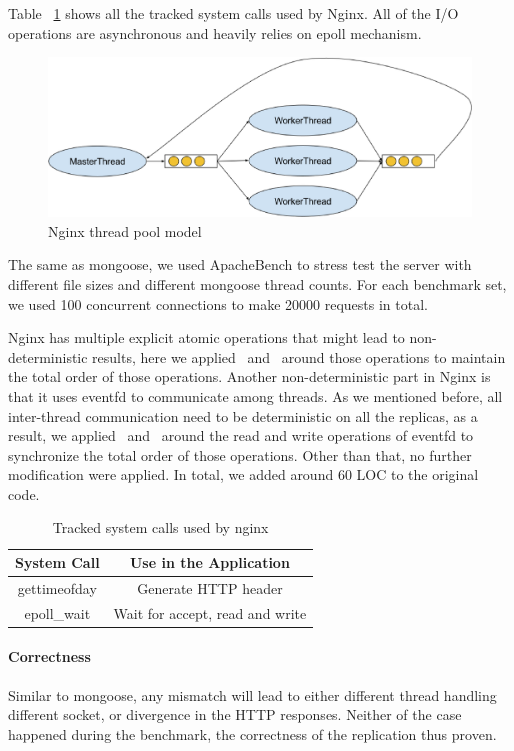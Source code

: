 Table ~\ref{t:nginx_syscall} shows all the tracked system calls used by Nginx. All of the I/O operations are asynchronous and heavily relies on epoll mechanism. 

\begin{figure}
\centering
\includegraphics[width=0.8\columnwidth]{figures/nginx_model}
\caption{Nginx thread pool model}
\label{f:nginx_model}
\end{figure}

The same as mongoose, we used ApacheBench to stress test the server with different file sizes and different mongoose thread counts. For each benchmark set, we used 100 concurrent connections to make 20000 requests in total.

Nginx has multiple explicit atomic operations that might lead to non-deterministic results, here we applied \detstart\ and \detend\ around those operations to maintain the total order of those operations. Another non-deterministic part in Nginx is that it uses eventfd to communicate among threads. As we mentioned before, all inter-thread communication need to be deterministic on all the replicas, as a result, we applied \detstart\ and \detend\ around the read and write operations of eventfd to synchronize the total order of those operations. Other than that, no further modification were applied. In total, we added around 60 LOC to the original code.

\begin{table}
\caption{Tracked system calls used by nginx}
\begin{center}
 \begin{tabular}{c | c }
System Call & Use in the Application\\ \hline
 gettimeofday & Generate HTTP header\\ \hline
 epoll\_wait & Wait for accept, read and write
 \end{tabular}
\end{center}
\label{t:nginx_syscall}
\end{table}

\paragraph{Correctness} Similar to mongoose, any mismatch will lead to either different thread handling different socket, or divergence in the HTTP responses. Neither of the case happened during the benchmark, the correctness of the replication thus proven.

